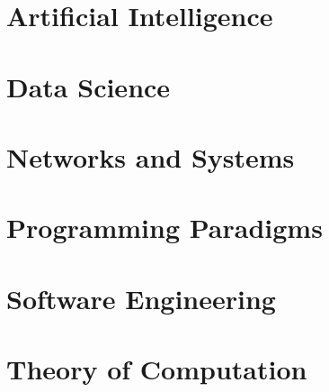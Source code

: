 \part{Artificial Intelligence}



\newpage\part{Data Science}



\newpage\part{Networks and Systems}



\newpage\part{Programming Paradigms}



\newpage\part{Software Engineering}



\newpage\part{Theory of Computation}

